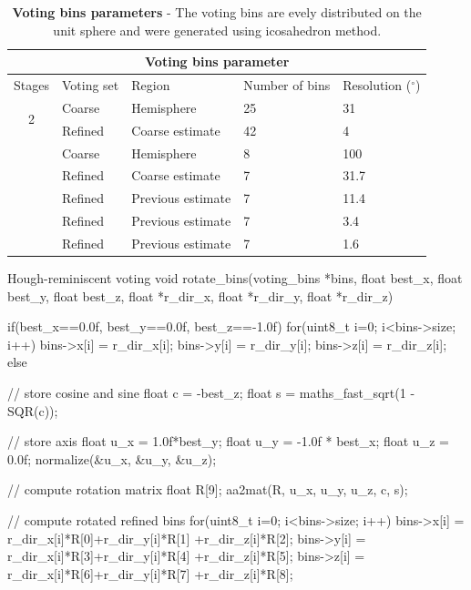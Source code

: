 \begin{table}[h!]
	\centering
	\begin{tabular}{|c|p{2cm}||p{3cm}|p{3cm}|p{3cm}|}
	   \hline
	   \multicolumn{5}{|c|}{Voting bins parameter} \\
	   \hline
	   Stages & Voting set & Region & Number of bins & Resolution ($^\circ$) \\
	   \hline
	   \multirow{2}{*}{2} & Coarse & Hemisphere & 25 & 31\\
	   \cline{2-5}
	    & Refined & Coarse estimate & 42 & 4\\
	   \hhline{|=|=#=|=|=|}
	   \multirow{5}{*}{5} & Coarse & Hemisphere & 8 & 100\\
	   \cline{2-5}
	    & Refined & Coarse estimate & 7 & 31.7\\
	   \cline{2-5}
	    & Refined & Previous estimate & 7 & 11.4\\
	   \cline{2-5}
	    & Refined & Previous estimate & 7 & 3.4\\
	   \cline{2-5}
	    & Refined & Previous estimate & 7 & 1.6\\
	   \hline
	\end{tabular}
	\caption{\textbf{Voting bins parameters} - The voting bins are evely distributed on the unit sphere and were generated using icosahedron method.}
	\label{tab:votingBins}
\end{table}

\begin{code}[colback=white, label=algo:rotation]{Hough-reminiscent voting}
void rotate_bins(voting_bins *bins, float best_x, 
						float best_y, float best_z, 
						float *r_dir_x, float *r_dir_y, 
						float *r_dir_z)
{
	if(best_x==0.0f, best_y==0.0f, best_z==-1.0f){
		for(uint8_t i=0; i<bins->size; i++){
			bins->x[i] = r_dir_x[i];
			bins->y[i] = r_dir_y[i];
			bins->z[i] = r_dir_z[i];
		} 
	}
	else{
		// store cosine and sine
		float c = -best_z;
		float s = maths_fast_sqrt(1 - SQR(c)); 

		// store axis
		float u_x = 1.0f*best_y;					
		float u_y = -1.0f * best_x;					
		float u_z = 0.0f;
		normalize(&u_x, &u_y, &u_z);

		// compute rotation matrix
		float R[9];
		aa2mat(R, u_x, u_y, u_z, c, s);

		// compute rotated refined bins
		for(uint8_t i=0; i<bins->size; i++){
			bins->x[i] = r_dir_x[i]*R[0]+r_dir_y[i]*R[1]
							+r_dir_z[i]*R[2];
			bins->y[i] = r_dir_x[i]*R[3]+r_dir_y[i]*R[4]
							+r_dir_z[i]*R[5];
			bins->z[i] = r_dir_x[i]*R[6]+r_dir_y[i]*R[7]
							+r_dir_z[i]*R[8];
		} 
	}
}
\end{code}

\newpage
